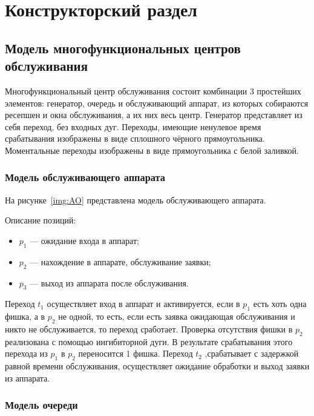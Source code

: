 \chapter{Конструкторский раздел}

\section{Модель многофункциональных центров\\обслуживания}

Многофункциональный центр обслуживания состоит комбинации 3 простейших элементов: генератор, очередь и обслуживающий аппарат, из которых собираются ресепшен и окна обслуживания, а их них весь центр. Генератор представляет из себя переход, без входных дуг. Переходы, имеющие ненулевое время срабатывания изображены в виде сплошного чёрного прямоугольника. Моментальные переходы изображены в виде прямоугольника с белой заливкой.


\subsection{Модель обслуживающего аппарата}

На рисунке~\ref{img:AO} представлена модель обслуживающего аппарата.

\FloatBarrier

Описание позиций:
\begin{itemize}[label=---]
	\item $p_1$ --- ожидание входа в аппарат;
	\item $p_2$ --- нахождение в аппарате, обслуживание заявки;
	\item $p_3$ --- выход из аппарата после обслуживания.
\end{itemize}

Переход $t_1$ осуществляет вход в аппарат и активируется, если в $p_1$ есть хоть одна фишка, а в $p_2$ не одной, то есть, если есть заявка ожидающая обслуживания и никто не обслуживается, то переход сработает. Проверка отсутствия фишки в $p_2$ реализована с помощью ингибиторной дуги. В результате срабатывания этого перехода из $p_1$ в $p_2$ переносится 1 фишка. Переход $t_2$ ,срабатывает с задержкой равной времени обслуживания, осуществляет ожидание обработки и выход заявки из аппарата.

\subsection{Модель очереди}

